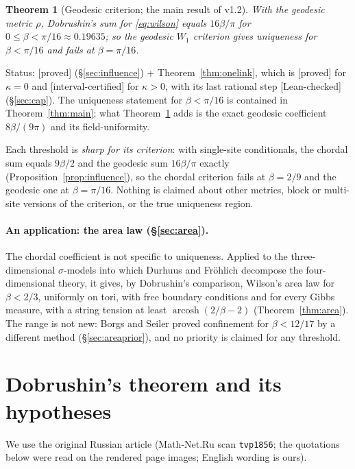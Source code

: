 \documentclass[11pt,a4paper]{article}
\newtheorem{theorem}{Theorem}
\theoremstyle{remark}
\theoremstyle{definition}
\theoremstyle{plain}
\theoremstyle{remark}
\DeclareMathOperator{\arcosh}{arcosh}
\newcommand{\st}[1]{\textsf{[#1]}}
\begin{document}
\begin{theorem}[Geodesic criterion; the main result of v1.2]\label{thm:geo}
With the geodesic metric $\rho$, Dobrushin's sum for \eqref{eq:wilson} equals $16\beta/\pi$ for
$0\le\beta<\pi/16\approx0.19635$; so the geodesic $W_1$ criterion gives uniqueness for $\beta<\pi/16$ and fails at
$\beta=\pi/16$.
\end{theorem}
\noindent Status: \st{proved} (\S\ref{sec:influence}) + Theorem~\ref{thm:onelink}, which is \st{proved} for
$\kappa=0$ and \st{interval-certified} for $\kappa>0$, with its last rational step \st{Lean-checked}
(\S\ref{sec:cap}). The uniqueness statement for $\beta<\pi/16$ is contained in Theorem~\ref{thm:main}; what
Theorem~\ref{thm:geo} adds is the exact geodesic coefficient $8\beta/(9\pi)$ and its field-uniformity.

Each threshold is \emph{sharp for its criterion}: with single-site conditionals, the chordal sum equals $9\beta/2$
and the geodesic sum $16\beta/\pi$ exactly (Proposition~\ref{prop:influence}), so the chordal criterion fails at
$\beta=2/9$ and the geodesic one at $\beta=\pi/16$. Nothing is claimed about other metrics, block or multi-site
versions of the criterion, or the true uniqueness region.

\paragraph{An application: the area law (\S\ref{sec:area}).} The chordal coefficient is not specific to uniqueness. Applied to the
three-dimensional $\sigma$-models into which Durhuus and Fr\"ohlich \cite{DF80} decompose the four-dimensional theory, it gives, by
Dobrushin's comparison, Wilson's area law for $\beta<2/3$, uniformly on tori, with free boundary conditions and for every Gibbs
measure, with a string tension at least $\arcosh(2/\beta-2)$ (Theorem~\ref{thm:area}). The range is not new: Borgs and Seiler
\cite{BS83} proved confinement for $\beta<12/17$ by a different method (\S\ref{sec:areaprior}), and no priority is claimed for any threshold.

\section{Dobrushin's theorem and its hypotheses}\label{sec:dobrushin}

We use the original Russian article \cite{Dob70} (Math-Net.Ru scan \texttt{tvp1856}; the
quotations below were read on the rendered page images; English wording is ours).
\end{document}
